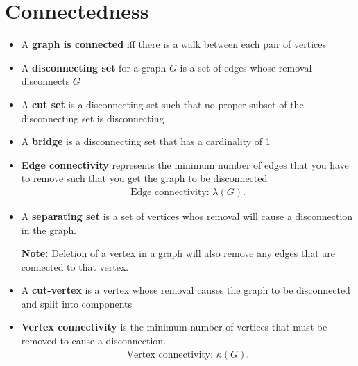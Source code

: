 \documentclass{report}
\begin{document}
    \pagebreak \bigbreak \noindent 
    \section{\LARGE Connectedness}
    \bigbreak \noindent 
    \smallbreak \noindent
    \begin{definition}
        \begin{itemize}
            \item A \textbf{graph is connected} iff there is a walk between each pair of vertices
            \item A \textbf{disconnecting set} for a graph $G$ is a set of edges whose removal disconnects $G$  
            \item A \textbf{cut set} is a disconnecting set such that no proper subset of the disconnecting set is disconnecting 
            \item A \textbf{bridge} is a disconnecting set that has a cardinality of 1 
            \item \textbf{Edge connectivity} represents  the minimum number of edges that you have to remove such that you get the graph to be disconnected
            \begin{align*}
                \text{Edge connectivity: } \lambda(G)
            .\end{align*}
        \item A \textbf{separating set} is a set of vertices whos removal will cause a disconnection in the graph. 

            \textbf{Note:} Deletion of a vertex in a graph will also remove any edges that are connected to that vertex. 
        \item A \textbf{cut-vertex} is a vertex whose removal causes the graph to be disconnected and split into components 
        \item \textbf{Vertex connectivity} is the minimum number of vertices that must be removed to cause a disconnection.
            \begin{align*}
                \text{Vertex connectivity: } \kappa(G)
            .\end{align*}
        \end{itemize}
    \end{definition}

    \pagebreak \bigbreak \noindent 
\end{document}

